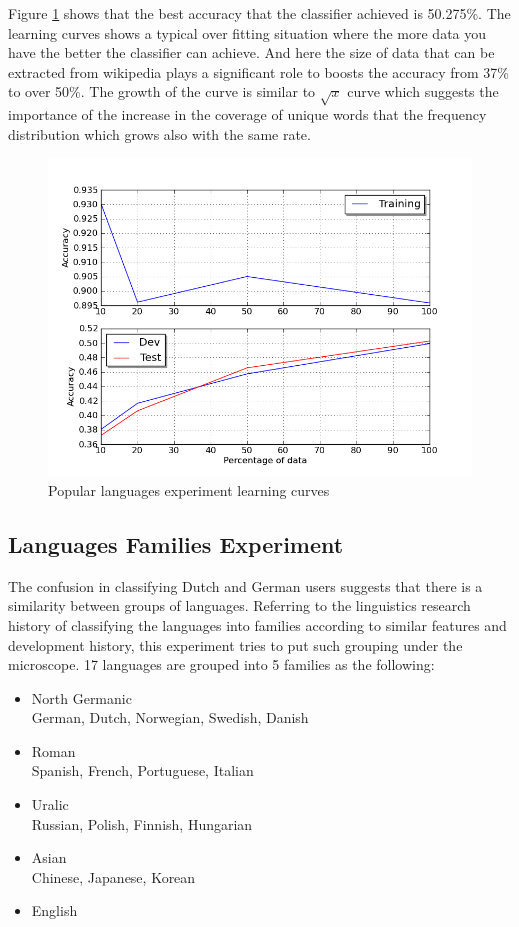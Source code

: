 \documentclass[11pt]{article}
\begin{document}
Figure \ref{pop_lc} shows that the best accuracy that the classifier achieved is 50.275\%. The learning curves shows a typical over fitting situation where the more data you have the better the classifier can achieve. And here the size of data that can be extracted from wikipedia plays a significant role to boosts the accuracy from 37\% to over 50\%. The growth of the curve is similar to $\sqrt{x}$ curve which suggests the importance of the increase in the coverage of unique words that the frequency distribution which grows also with the same rate.


\begin{figure}[htp]
\centering
\includegraphics[scale=0.45]{popular_lc.png}
\caption{Popular languages experiment learning curves}
\label{pop_lc}
\end{figure}
		
\subsection{Languages Families Experiment}

The confusion in classifying Dutch and German users suggests that there is a similarity between groups of languages. Referring to the linguistics research history of classifying the languages into families according to similar features and development history, this experiment tries to put such grouping under the microscope. 17 languages are grouped into 5 families as the following:
\begin{itemize}
\item North Germanic\\
German, Dutch, Norwegian, Swedish, Danish
\item Roman\\
Spanish, French, Portuguese, Italian
\item Uralic \\
Russian, Polish, Finnish, Hungarian
\item Asian\\
Chinese, Japanese, Korean
\item English
\end{itemize}
\end{document}
